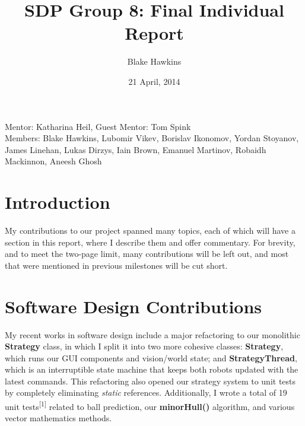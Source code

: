 \documentclass[a4paper,11pt]{article}
\title{SDP Group 8: Final Individual Report} %
\author{Blake Hawkins} %
\date{21 April, 2014} %
\begin{document}
\maketitle %

\begin{center}
Mentor: Katharina Heil, Guest Mentor: Tom Spink %
\\
Members: Blake Hawkins, %
Lubomir Vikev,
Borislav Ikonomov,
Yordan Stoyanov,
James Linehan,
Lukas Dirzys,
Iain Brown,
Emanuel Martinov,
Robaidh Mackinnon,
Aneesh Ghosh

\end{center}


\section{Introduction}

My contributions to our project spanned many topics, each of which will have a section in this report, where I describe them and offer commentary. For brevity, and to meet the two-page limit, many contributions will be left out, and most that were mentioned in previous milestones will be cut short.


\section{Software Design Contributions}

My recent works in software design include a major refactoring to our monolithic \textbf{Strategy} class, in which I split it into two more cohesive classes: \textbf{Strategy}, which runs our GUI components and vision/world state; and \textbf{StrategyThread}, which is an interruptible state machine that keeps both robots updated with the latest commands. This refactoring also opened our strategy system to unit tests by completely eliminating \textit{static} references. Additionally, I wrote a total of 19 unit tests\textsuperscript{[1]} related to ball prediction, our \textbf{minorHull()} algorithm, and various vector mathematics methods.
\end{document}
